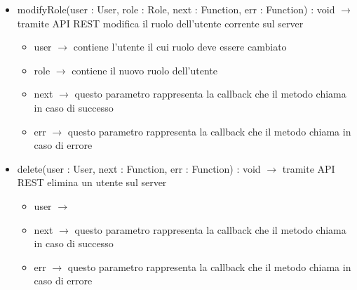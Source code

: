\begin{description}
\begin{itemize}
	\item modifyRole(user : User, role : Role, next : Function, err : Function) : void $\rightarrow$ tramite API REST modifica il ruolo dell'utente corrente sul server\begin{itemize}
		\item user $\rightarrow$ contiene l'utente il cui ruolo deve essere cambiato
		\item role $\rightarrow$ contiene il nuovo ruolo dell'utente
		\item next $\rightarrow$ questo parametro rappresenta la callback che il metodo chiama in caso di successo
		\item err $\rightarrow$ questo parametro rappresenta la callback che il metodo chiama in caso di errore
	\end{itemize}
	
	\item delete(user : User, next : Function, err : Function) : void $\rightarrow$ tramite API REST elimina un utente sul server\begin{itemize}
		\item user $\rightarrow$ 
		\item next $\rightarrow$ questo parametro rappresenta la callback che il metodo chiama in caso di successo
		\item err $\rightarrow$ questo parametro rappresenta la callback che il metodo chiama in caso di errore
	\end{itemize}
	
\end{itemize}

\end{description}


